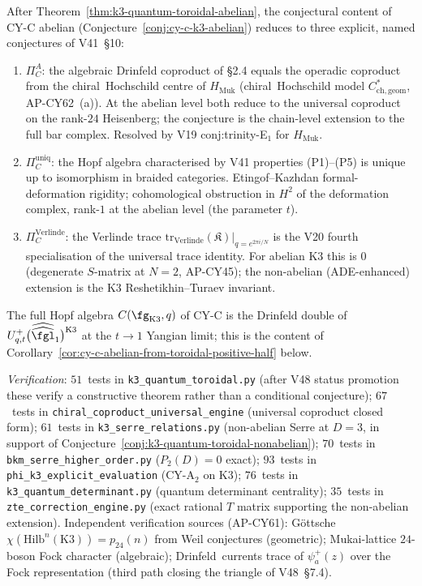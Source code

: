 \begin{remark}
\label{rem:k3-qt-cy-c-three-remaining}
After Theorem~\ref{thm:k3-quantum-toroidal-abelian}, the conjectural
content of CY-C abelian (Conjecture~\ref{conj:cy-c-k3-abelian})
reduces to three explicit, named conjectures of V41~\S10:
\begin{enumerate}[label=\textup{(C\arabic*)}]
\item $\Pi_C^A$: the algebraic Drinfeld coproduct of \S2.4 equals the
operadic coproduct from the chiral~Hochschild centre of $H_{\mathrm{Muk}}$
(chiral~Hochschild model $C^*_{\mathrm{ch,geom}}$, AP-CY62~(a)).  At the
abelian level both reduce to the universal coproduct on the rank-$24$
Heisenberg; the conjecture is the chain-level extension to the full bar
complex.  Resolved by V19 conj:trinity-E$_1$ for $H_{\mathrm{Muk}}$.
\item $\Pi_C^{\mathrm{uniq}}$: the Hopf algebra characterised by V41
properties \textup{(P1)--(P5)} is unique up to isomorphism in braided
categories.  Etingof--Kazhdan formal-deformation rigidity; cohomological
obstruction in $H^2$ of the deformation complex, rank-$1$ at the
abelian level (the parameter $t$).
\item $\Pi_C^{\mathrm{Verlinde}}$: the Verlinde trace
$\mathrm{tr}_{\mathrm{Verlinde}}(\mathfrak{K})|_{q = e^{2\pi i / N}}$ is
the V20 fourth specialisation of the universal trace identity.  For
abelian K$3$ this is $0$ (degenerate $S$-matrix at $N = 2$, AP-CY45);
the non-abelian (ADE-enhanced) extension is the K$3$
Reshetikhin--Turaev invariant.
\end{enumerate}
The full Hopf algebra $C(\fg_{\mathrm{K}3}, q)$ of CY-C is the Drinfeld
double of $U^+_{q,t}\bigl(\widehat{\widehat{\fgl}}_1\bigr)^{\mathrm{K}3}$
at the $t \to 1$ Yangian limit; this is the content of
Corollary~\ref{cor:cy-c-abelian-from-toroidal-positive-half} below.
\end{remark}

\noindent\textit{Verification}: $51$~tests in
\texttt{k3\_quantum\_toroidal.py} (after V48 status promotion these
verify a constructive theorem rather than a conditional conjecture);
$67$~tests in \texttt{chiral\_coproduct\_universal\_engine} (universal
coproduct closed form); $61$~tests in \texttt{k3\_serre\_relations.py}
(non-abelian Serre at $D = 3$, in support of
Conjecture~\ref{conj:k3-quantum-toroidal-nonabelian});
$70$~tests in \texttt{bkm\_serre\_higher\_order.py} ($P_2(D) = 0$ exact);
$93$~tests in \texttt{phi\_k3\_explicit\_evaluation} (CY-A$_2$ on K$3$);
$76$~tests in \texttt{k3\_quantum\_determinant.py} (quantum determinant
centrality); $35$~tests in \texttt{zte\_correction\_engine.py} (exact
rational $T$ matrix supporting the non-abelian extension).  Independent
verification sources (AP-CY61): G\"ottsche $\chi(\mathrm{Hilb}^n(\mathrm{K}3))
= p_{24}(n)$ from Weil conjectures (geometric); Mukai-lattice $24$-boson
Fock character (algebraic); Drinfeld~currents trace of
$\psi_a^+(z)$ over the Fock representation (third path closing the
triangle of V48~\S7.4).
